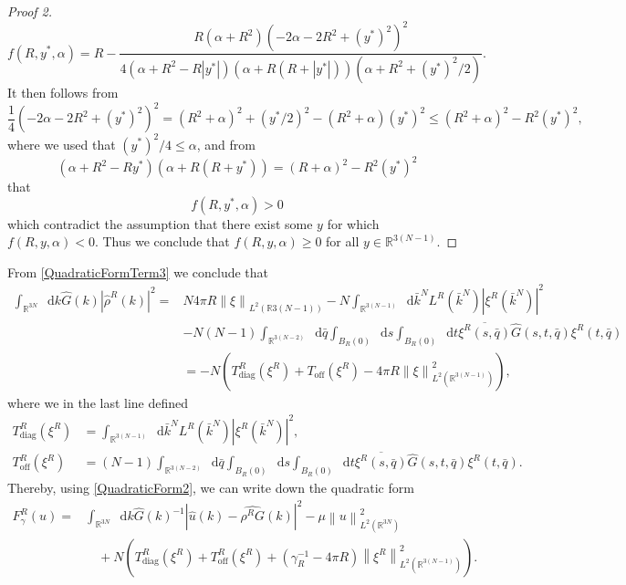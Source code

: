 \documentclass[a4paper,11pt]{article}
\newcommand{\norm}[1]{\left\lVert #1 \right\rVert}
\newcommand{\abs}[1]{\left\lvert #1 \right\rvert}
\newcommand*\diff{\mathop{}\!\mathrm{d}}
\newcommand{\R}{\mathbb{R}}
\numberwithin{equation}{section}
\begin{document}
\begin{proof}[Proof 2]
\begin{equation}
	f(R,y^*,\alpha)=R-\frac{R \left(\alpha +R^2\right) \left(-2 \alpha -2 R^2+(y^*)^2\right)^2}{4 \left(\alpha +R^2-R \abs{y^*}\right) (\alpha +R (R+\abs{y^*})) \left( \alpha + R^2+(y^*)^2/2\right)}.
	\end{equation}
	It then follows from \begin{equation}
	\frac{1}{4}\left(-2 \alpha -2 R^2+(y^*)^2\right)^2=(R^2+\alpha)^2+(y^*/2)^2-(R^2+\alpha)(y^*)^2\leq(R^2+\alpha)^2-R^2(y^*)^2,
	\end{equation}
	where we used that $ (y^*)^2/4\leq\alpha $, and from \begin{equation}
	\left(\alpha +R^2-R y^*\right) (\alpha +R (R+y^*))=(R+\alpha)^2-R^2(y^*)^2
	\end{equation}
	that \begin{equation}
	f(R,y^*,\alpha)> 0
	\end{equation}
	which contradict the assumption that there exist some $ y $ for which $ f(R,y,\alpha)<0 $. Thus we conclude that $ f(R,y,\alpha)\geq0 $ for all $ y\in\R^{3(N-1)} $.
\end{proof}
\vspace{0.5cm}
From \eqref{QuadraticFormTerm3} we conclude that \begin{equation}
\begin{aligned}
\int_{\R^{3N}}\diff k\hat{G}(k)\abs{\hat{\rho}^R(k)}^2=&N4\pi R \norm{\xi}_{L^2(\R{3(N-1)})}-N\int_{\R^{3(N-1)}}\diff \bar{k}^N L^R(\bar{k}^N) \abs{\xi^R(\bar{k}^N)}^2\\&-N(N-1)\int_{\R^{3(N-2)}}\diff \bar{q}\int_{B_R(0)}\diff s\int_{B_R(0)}\diff t \overline{\xi^R(s,\bar{q})}\hat{G}(s,t,\bar{q})\xi^R(t,\bar{q})\\
&= -N\left(T_{\text{diag}}^R(\xi^R)+T_{\text{off}}(\xi^R)-4\pi R\norm{\xi}_{L^2(\R^{3(N-1)})}^2\right),
\end{aligned}
\end{equation}
where we in the last line defined\begin{equation}
\begin{aligned}
T^R_{\text{diag}}(\xi^R)&=\int_{\R^{3(N-1)}}\diff \bar{k}^N L^R(\bar{k}^N) \abs{\xi^R(\bar{k}^N)}^2,\\
T^R_{\text{off}}(\xi^R)&=(N-1)\int_{\R^{3(N-2)}}\diff \bar{q}\int_{B_R(0)}\diff s\int_{B_R(0)}\diff t \overline{\xi^R(s,\bar{q})}\hat{G}(s,t,\bar{q})\xi^R(t,\bar{q}).
\end{aligned}
\end{equation}
Thereby, using \eqref{QuadraticForm2}, we can write down the quadratic form\begin{equation}
\begin{aligned}
F_\gamma^R(u)=&\int_{\R^{3N}}\diff k \hat{G}(k)^{-1}|\hat{u}(k)-\widehat{\rho^R G}(k)|^2-\mu\norm{u}^2_{L^2(\R^{3N})}\\&\quad+N\left(T^R_{\text{diag}}(\xi^R)+T^R_{\text{off}}(\xi^R)+(\gamma_R^{-1}-4\pi R)\norm{\xi^R}_{L^2(\R^{3(N-1)})}^2\right).
\end{aligned}
\end{equation}
\end{document}
